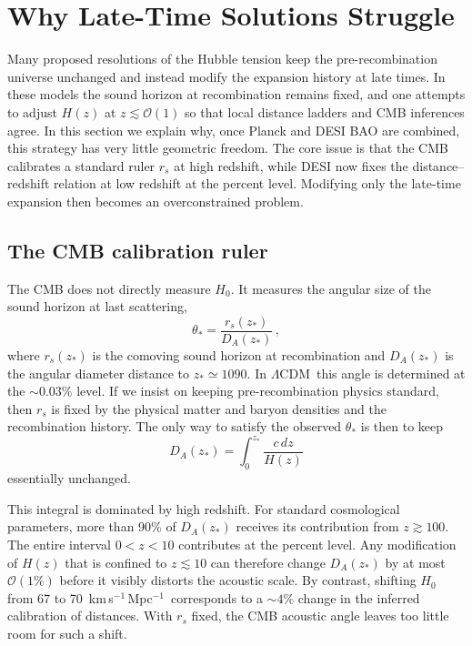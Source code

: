 \documentclass[twocolumn,showpacs,preprintnumbers,amsmath,amssymb,prd]{revtex4-2}
\newcommand{\lcdm}{$\Lambda$CDM}
\newcommand{\kms}{km\,s$^{-1}$\,Mpc$^{-1}$}
\begin{document}
\section{Why Late-Time Solutions Struggle}
\label{sec:latetime}

Many proposed resolutions of the Hubble tension keep the pre-recombination universe 
unchanged and instead modify the expansion history at late times. In these models 
the sound horizon at recombination remains fixed, and one attempts to adjust $H(z)$ 
at $z \lesssim \mathcal{O}(1)$ so that local distance ladders and CMB inferences agree. 
In this section we explain why, once Planck and DESI BAO are combined, this strategy 
has very little geometric freedom. The core issue is that the CMB calibrates a standard 
ruler $r_s$ at high redshift, while DESI now fixes the distance--redshift relation at 
low redshift at the percent level. Modifying only the late-time expansion then becomes 
an overconstrained problem.

\subsection{The CMB calibration ruler}

The CMB does not directly measure $H_0$. It measures the angular size of the sound 
horizon at last scattering,
\begin{equation}
  \theta_\ast = \frac{r_s(z_\ast)}{D_A(z_\ast)} \,,
  \label{eq:theta_star}
\end{equation}
where $r_s(z_\ast)$ is the comoving sound horizon at recombination and $D_A(z_\ast)$ 
is the angular diameter distance to $z_\ast \simeq 1090$. In \lcdm\ this angle is 
determined at the $\sim 0.03\%$ level. If we insist on keeping pre-recombination 
physics standard, then $r_s$ is fixed by the physical matter and baryon densities 
and the recombination history. The only way to satisfy the observed $\theta_\ast$ 
is then to keep
\begin{equation}
  D_A(z_\ast) = \int_0^{z_\ast} \frac{c\,dz}{H(z)}
  \label{eq:DA}
\end{equation}
essentially unchanged.

This integral is dominated by high redshift. For standard cosmological parameters, 
more than 90\% of $D_A(z_\ast)$ receives its contribution from $z \gtrsim 100$. 
The entire interval $0 < z < 10$ contributes at the percent level. Any modification 
of $H(z)$ that is confined to $z \lesssim 10$ can therefore change $D_A(z_\ast)$ 
by at most $\mathcal{O}(1\%)$ before it visibly distorts the acoustic scale. By 
contrast, shifting $H_0$ from 67 to 70~\kms\ corresponds to a $\sim 4\%$ change 
in the inferred calibration of distances. With $r_s$ fixed, the CMB acoustic angle 
leaves too little room for such a shift.
\end{document}
